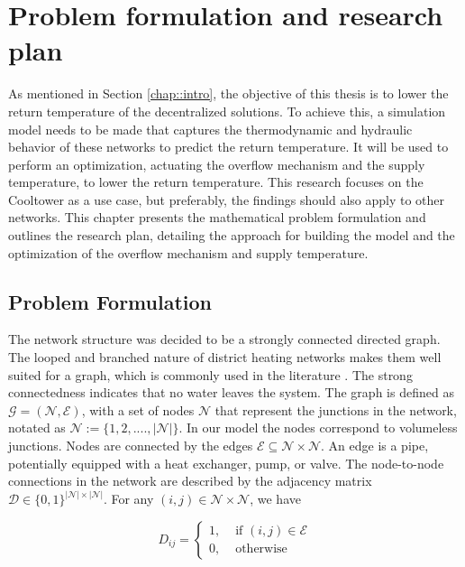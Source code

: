 \chapter{Problem formulation and research plan}\label{chap::PoA}
As mentioned in Section \ref{chap::intro}, the objective of this thesis is to lower the return temperature of the decentralized solutions. To achieve this, a simulation model needs to be made that captures the thermodynamic and hydraulic behavior of these networks to predict the return temperature. It will be used to perform an optimization, actuating the overflow mechanism and the supply temperature, to lower the return temperature. This research focuses on the Cooltower as a use case, but preferably, the findings should also apply to other networks. This chapter presents the mathematical problem formulation and outlines the research plan, detailing the approach for building the model and the optimization of the overflow mechanism and supply temperature.

\section{Problem Formulation} 

The network structure was decided to be a strongly connected directed graph. The looped and branched nature of district heating networks makes them well suited for a graph, which is commonly used in the literature \cite{sibeijn2025economic, Krug2020,OPPELT2016336,Simonssongraph}. The strong connectedness indicates that no water leaves the system. The graph is defined as $\mathcal{G}=(\mathcal{N}, \mathcal{E})$, with a set of nodes $\mathcal{N}$ that represent the junctions in the network, notated as $\mathcal{N}:= \{1,2,....,|\mathcal{N}|\}$. In our model the nodes correspond to volumeless junctions. Nodes are connected by the edges $\mathcal{E} \subseteq \mathcal{N} \times \mathcal{N}$. An edge is a pipe, potentially equipped with a heat exchanger, pump, or valve. The node-to-node connections in the network are described by the adjacency matrix $\mathcal{D} \in \{0,1\}^{|\mathcal{N}| \times |\mathcal{N}|}$. For any $(i,j) \in \mathcal{N} \times \mathcal{N}$, we have

\begin{equation}
D_{i j}= \begin{cases}1, & \text { if }(i, j) \in \mathcal{E} \\ 0, & \text { otherwise }\end{cases}
\end{equation}

